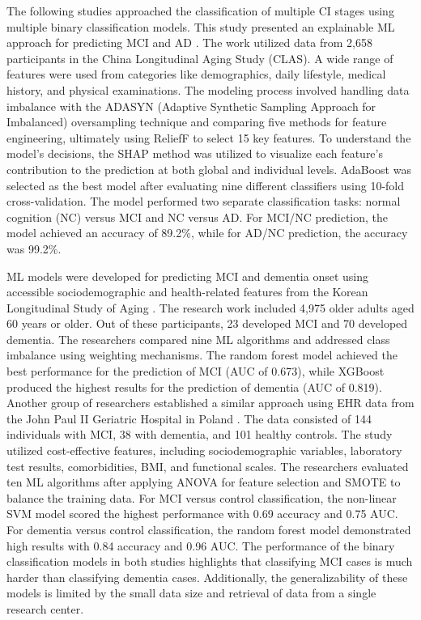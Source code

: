 The following studies approached the classification of multiple CI stages using multiple binary classification models. This study presented an explainable ML approach for predicting MCI and AD \cite{Yue2023Explainable}. The work utilized data from 2,658 participants in the China Longitudinal Aging Study (\acrshort{CLAS}). A wide range of features were used from categories like demographics, daily lifestyle, medical history, and physical examinations. The modeling process involved handling data imbalance with the \acrshort{ADASYN} (Adaptive Synthetic Sampling Approach for Imbalanced) oversampling technique and comparing five methods for feature engineering, ultimately using ReliefF to select 15 key features. To understand the model's decisions, the SHAP method was utilized to visualize each feature's contribution to the prediction at both global and individual levels. AdaBoost was selected as the best model after evaluating nine different classifiers using 10-fold cross-validation. The model performed two separate classification tasks: normal cognition (\acrshort{NC}) versus MCI and NC versus AD. For MCI/NC prediction, the model achieved an accuracy of 89.2\%, while for AD/NC prediction, the accuracy was 99.2\%.

ML models were developed for predicting MCI and dementia onset using accessible sociodemographic and health-related features from the Korean Longitudinal Study of Aging \cite{Oh2024Multivariable}. The research work included 4,975 older adults aged 60 years or older. Out of these participants, 23 developed MCI and 70 developed dementia. The researchers compared nine ML algorithms and addressed class imbalance using weighting mechanisms. The random forest model achieved the best performance for the prediction of MCI (AUC of 0.673), while XGBoost produced the highest results for the prediction of dementia (AUC of 0.819). Another group of researchers established a similar approach using EHR data from the John Paul II Geriatric Hospital in Poland \cite{Richter2025Cognitive}. The data consisted of 144 individuals with MCI, 38 with dementia, and 101 healthy controls. The study utilized cost-effective features, including sociodemographic variables, laboratory test results, comorbidities, BMI, and functional scales. The researchers evaluated ten ML algorithms after applying \acrshort{ANOVA} for feature selection and SMOTE to balance the training data. For MCI versus control classification, the non-linear SVM model scored the highest performance with 0.69 accuracy and 0.75 AUC. For dementia versus control classification, the random forest model demonstrated high results with 0.84 accuracy and 0.96 AUC. The performance of the binary classification models in both studies highlights that classifying MCI cases is much harder than classifying dementia cases. Additionally, the generalizability of these models is limited by the small data size and retrieval of data from a single research center.

